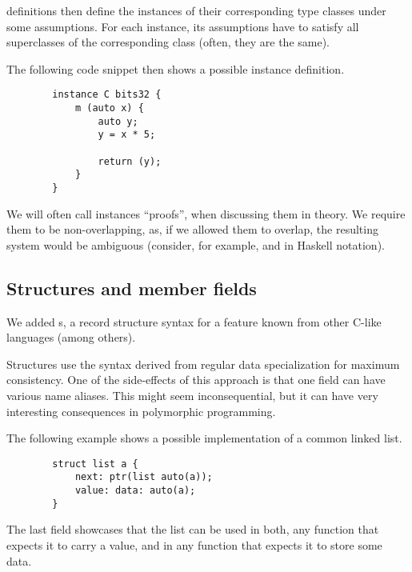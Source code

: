 definitions then define the instances of their corresponding type classes under some assumptions. For each instance, its assumptions have to satisfy all superclasses of the corresponding class (often, they are the same).

\begin{ex}[Instance]
    The following code snippet then shows a possible instance definition.

    \begin{lstlisting}
        instance C bits32 {
            m (auto x) {
                auto y;
                y = x * 5;

                return (y);
            }
        }
    \end{lstlisting}
\end{ex}

We will often call instances ``proofs'', when discussing them in theory. We require them to be non-overlapping, as, if we allowed them to overlap, the resulting system would be ambiguous (consider, for example,  and  in Haskell notation).

\subsection{Structures and member fields}

We added s, a record structure syntax for a feature known from other C-like languages (among others).

Structures use the syntax derived from regular data specialization for maximum consistency. One of the side-effects of this approach is that one field can have various name aliases. This might seem inconsequential, but it can have very interesting consequences in polymorphic programming.

\begin{ex}
    \label{list_ex}
    The following example shows a possible implementation of a common linked list.

    \begin{lstlisting}
        struct list a {
            next: ptr(list auto(a));
            value: data: auto(a);
        }
    \end{lstlisting}

    The last field showcases that the list can be used in both, any function that expects it to carry a value, and in any function that expects it to store some data.
\end{ex}

